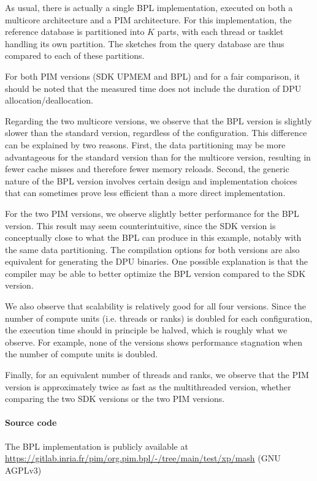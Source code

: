 As usual, there is actually a single BPL implementation, executed on both a multicore architecture and a PIM architecture. 
For this implementation, the reference database is partitioned into $K$ parts, with each thread or tasklet handling its own partition. The sketches from the query database are thus compared to each of these partitions.

For both PIM versions (SDK UPMEM and BPL) and for a fair comparison, it should be noted that the measured time does not include the duration of DPU allocation/deallocation.

Regarding the two multicore versions, we observe that the BPL version is slightly slower than the standard version, regardless of the configuration. This difference can be explained by two reasons. First, the data partitioning may be more advantageous for the standard version than for the multicore version, resulting in fewer cache misses and therefore fewer memory reloads. Second, the generic nature of the BPL version involves certain design and implementation choices that can sometimes prove less efficient than a more direct implementation.

For the two PIM versions, we observe slightly better performance for the BPL version. This result may seem counterintuitive, since the SDK version is conceptually close to what the BPL can produce in this example, notably with the same data partitioning. The compilation options for both versions are also equivalent for generating the DPU binaries. One possible explanation is that the compiler may be able to better optimize the BPL version compared to the SDK version.

We also observe that scalability is relatively good for all four versions. Since the number of compute units (i.e. threads or ranks) is doubled for each configuration, the execution time should in principle be halved, which is roughly what we observe. For example, none of the versions shows performance stagnation when the number of compute units is doubled.

Finally, for an equivalent number of threads and ranks, we observe that the PIM version is approximately twice as fast as the multithreaded version, whether comparing the two SDK versions or the two PIM versions.

\paragraph{Source code} The BPL implementation is publicly available at \url{https://gitlab.inria.fr/pim/org.pim.bpl/-/tree/main/test/xp/mash} (GNU AGPLv3)